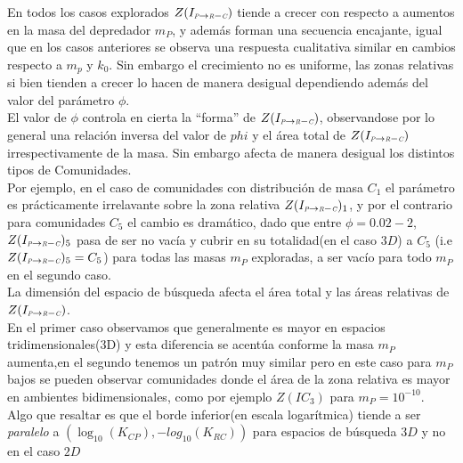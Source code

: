 En todos los casos explorados $Z(I_{\textit{\tiny P} \to \textit{\tiny R} - \textit{\tiny C}})$ tiende a crecer con respecto a aumentos en la masa del depredador $m_P$, y adem\'as forman una secuencia encajante, igual que en los casos anteriores se observa una respuesta cualitativa similar en cambios respecto a $m_p$ y $k_0$. Sin embargo el crecimiento no es uniforme, las zonas relativas si bien tienden a crecer lo hacen de manera desigual dependiendo adem\'as del valor del par\'ametro $\phi$.\\

El valor de $\phi$ controla en cierta la ``forma'' de $Z(I_{\textit{\tiny P} \to \textit{\tiny R} - \textit{\tiny C}})$, observandose por lo general una relaci\'on inversa del valor de $phi$ y el \'area total de $Z(I_{\textit{\tiny P} \to \textit{\tiny R} - \textit{\tiny C}})$ irrespectivamente de la masa. Sin embargo afecta de manera desigual los distintos tipos de Comunidades.\\ Por ejemplo, en el caso de comunidades con distribuci\'on de masa $C_1$ el par\'ametro es pr\'acticamente irrelavante sobre la zona relativa $Z(I_{\textit{\tiny P} \to \textit{\tiny R} - \textit{\tiny C}})_1$, y por el contrario para comunidades $C_5$ el cambio es dram\'atico, dado que entre $\phi  = 0.02 - 2$, $Z(I_{\textit{\tiny P} \to \textit{\tiny R} - \textit{\tiny C}})_5$ pasa de ser no vac\'ia y cubrir en su totalidad(en el caso $3D$) a $C_5$ (i.e $Z(I_{\textit{\tiny P} \to \textit{\tiny R} - \textit{\tiny C}})_5 = C_5$) para todas las masas $m_P$ exploradas, a ser vac\'io para todo $m_P$ en el segundo caso.\\
La dimensi\'on del espacio de b\'usqueda afecta el \'area total y las \'areas relativas de $Z(I_{\textit{\tiny P} \to \textit{\tiny R} - \textit{\tiny C}})$.\\
En el primer caso observamos que generalmente es mayor en espacios tridimensionales(3D) y esta diferencia se acent\'ua conforme la masa $m_P$ aumenta,en el segundo  tenemos un patr\'on muy similar pero en este caso para $m_P$ bajos se pueden observar comunidades donde el \'area de la zona relativa es mayor en ambientes bidimensionales, como por ejemplo $Z(IC_3)$ para $m_P = 10^{-10}$. \\
Algo que resaltar es que el borde inferior(en escala logar\'itmica) tiende a ser \emph{paralelo} a $(\log_{10}(K_{CP}),-log_{10}(K_{RC}))$ para espacios de b\'usqueda $3D$ y no en el caso $2D$


